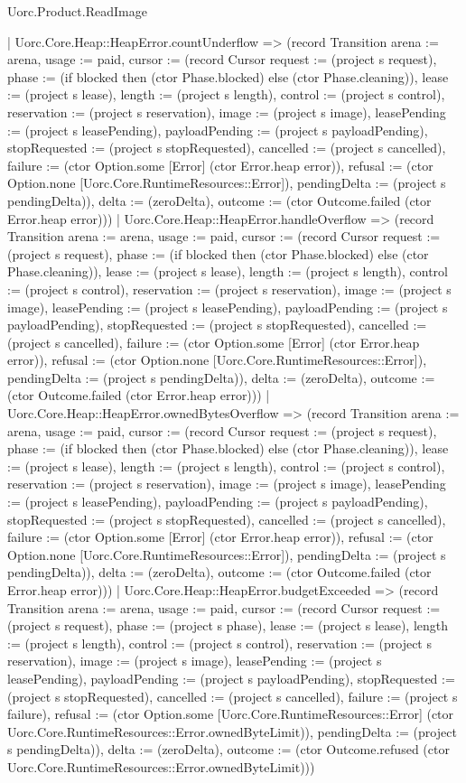 \begin{lexlean}{Uorc.Product.ReadImage}
\begin{semanticmodule}
{    | Uorc.Core.Heap::HeapError.countUnderflow => (record Transition {arena := arena, usage := paid, cursor := (record Cursor {request := (project s request), phase := (if blocked then (ctor Phase.blocked) else (ctor Phase.cleaning)), lease := (project s lease), length := (project s length), control := (project s control), reservation := (project s reservation), image := (project s image), leasePending := (project s leasePending), payloadPending := (project s payloadPending), stopRequested := (project s stopRequested), cancelled := (project s cancelled), failure := (ctor Option.some [Error] (ctor Error.heap error)), refusal := (ctor Option.none [Uorc.Core.RuntimeResources::Error]), pendingDelta := (project s pendingDelta)}), delta := (zeroDelta), outcome := (ctor Outcome.failed (ctor Error.heap error))})
    | Uorc.Core.Heap::HeapError.handleOverflow => (record Transition {arena := arena, usage := paid, cursor := (record Cursor {request := (project s request), phase := (if blocked then (ctor Phase.blocked) else (ctor Phase.cleaning)), lease := (project s lease), length := (project s length), control := (project s control), reservation := (project s reservation), image := (project s image), leasePending := (project s leasePending), payloadPending := (project s payloadPending), stopRequested := (project s stopRequested), cancelled := (project s cancelled), failure := (ctor Option.some [Error] (ctor Error.heap error)), refusal := (ctor Option.none [Uorc.Core.RuntimeResources::Error]), pendingDelta := (project s pendingDelta)}), delta := (zeroDelta), outcome := (ctor Outcome.failed (ctor Error.heap error))})
    | Uorc.Core.Heap::HeapError.ownedBytesOverflow => (record Transition {arena := arena, usage := paid, cursor := (record Cursor {request := (project s request), phase := (if blocked then (ctor Phase.blocked) else (ctor Phase.cleaning)), lease := (project s lease), length := (project s length), control := (project s control), reservation := (project s reservation), image := (project s image), leasePending := (project s leasePending), payloadPending := (project s payloadPending), stopRequested := (project s stopRequested), cancelled := (project s cancelled), failure := (ctor Option.some [Error] (ctor Error.heap error)), refusal := (ctor Option.none [Uorc.Core.RuntimeResources::Error]), pendingDelta := (project s pendingDelta)}), delta := (zeroDelta), outcome := (ctor Outcome.failed (ctor Error.heap error))})
    | Uorc.Core.Heap::HeapError.budgetExceeded => (record Transition {arena := arena, usage := paid, cursor := (record Cursor {request := (project s request), phase := (project s phase), lease := (project s lease), length := (project s length), control := (project s control), reservation := (project s reservation), image := (project s image), leasePending := (project s leasePending), payloadPending := (project s payloadPending), stopRequested := (project s stopRequested), cancelled := (project s cancelled), failure := (project s failure), refusal := (ctor Option.some [Uorc.Core.RuntimeResources::Error] (ctor Uorc.Core.RuntimeResources::Error.ownedByteLimit)), pendingDelta := (project s pendingDelta)}), delta := (zeroDelta), outcome := (ctor Outcome.refused (ctor Uorc.Core.RuntimeResources::Error.ownedByteLimit))})
}
\end{semanticmodule}
\end{lexlean}
